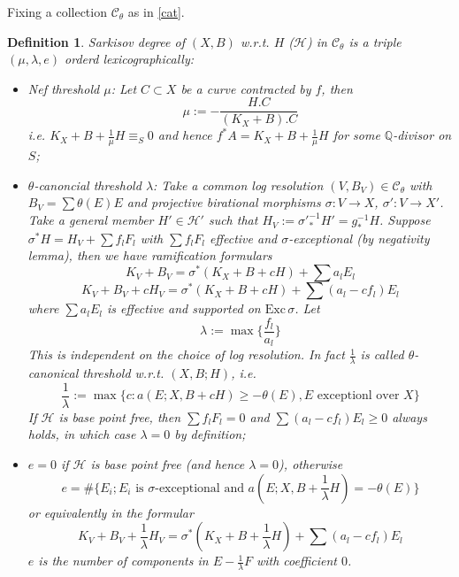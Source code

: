 \documentclass{article}
\newtheorem{defn}{Definition}[section]
\begin{document}
Fixing a collection $ \mathcal{C}_\theta $ as in \ref{cat}.
\begin{defn}
  Sarkisov degree of $ (X,B) $ w.r.t. $ H $ ($ \mathcal{H} $) in $ \mathcal{C}_\theta $ is a triple $ (\mu,\lambda,e) $ orderd lexicographically:
  \begin{itemize}
    \item Nef threshold $ \mu $: Let $ C\subset X  $ be a curve contracted by $ f $, then
      $$ \mu:=-\frac{H.C}{(K_X+B).C} $$
      i.e. $ K_X+B+\frac{1}{\mu} H \equiv_S0$ and hence $ f^*A=K_X+B+\frac{1}{\mu} H $ for some $ \mathbb{Q} $-divisor on $ S $;
    \item $ \theta $-canoncial threshold $ \lambda $: Take a common log resolution  $ (V,B_V)\in \mathcal{C}_\theta $ with $ B_V=\sum \theta(E)E $ and projective birational morphisms $ \sigma:V\to X $, $ \sigma':V\to X' $. Take a general member $ H'\in \mathcal{H}' $ such that $ H_V:=\sigma'^{-1}_*H'=g^{-1}_*H $. Suppose $ \sigma^*H=H_V+\sum f_lF_l $ with $ \sum f_lF_l $ effective and $ \sigma $-exceptional (by negativity lemma), then we have ramification formulars
      $$ K_V+B_V=\sigma^*(K_X+B+cH)+\sum a_lE_l  $$
      $$ K_V+B_V+cH_V=\sigma^*(K_X+B+cH)+\sum(a_l-cf_l)E_l $$
      where $ \sum a_lE_l $ is effective and supported on $ \mathrm{Exc}\,\sigma $.   Let
      $$ \lambda:=\max\{ \frac{f_l}{a_l}\} $$
      This is independent on the choice of log resolution. In fact $ \frac{1}{\lambda} $ is called $ \theta $-canonical threshold w.r.t. $ (X,B;H) $, i.e.
      $$ \frac{1}{\lambda}:=\max\{c:a(E;X,B+cH)\geqslant-\theta(E) ,E\text{ exceptionl over }X \}$$
      If $ \mathcal{H} $ is base point free, then $ \sum f_lF_l=0 $ and $\sum(a_l-cf_l)E_l\geqslant 0  $ always holds, in which case $ \lambda=0 $ by definition;
    \item $ e=0 $ if $ \mathcal{H} $ is base point free (and hence $ \lambda=0 $), otherwise
      $$ e=\#\{E_i; E_i \text{ is }\sigma\text{-exceptional and } a(E;X,B+\frac{1}{\lambda} H)=-\theta(E) \} $$
      or equivalently in the formular
      $$ K_V+B_V+\frac{1}{\lambda} H_V=\sigma^*(K_X+B+\frac{1}{\lambda} H)+\sum(a_l-cf_l)E_l $$
      $ e $ is the number of components in $ E-\frac{1}{\lambda} F $ with coefficient $ 0 $.
  \end{itemize}
\end{defn}
\end{document}
